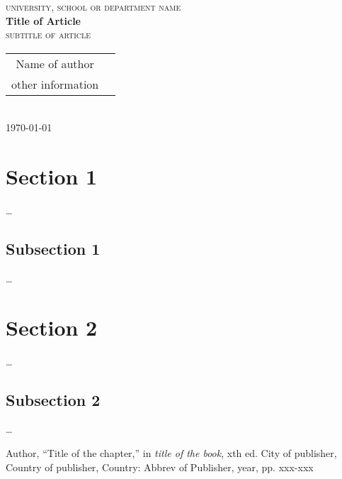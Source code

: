 \documentclass[10pt, a4paper, oneside]{article}
\begin{document}
\thispagestyle{empty}
\begin{center}
  \textsc{university, school or department name} \\ [60pt] 

  \textbf{{\LARGE Title of Article}} \\ [1pt]
  \textsc{{\large subtitle of article }} \\ [20pt]

  \begin{tabular}{cc}
    Name of author  \\
    other information
  \end{tabular} \\ [20pt]
  \today \\
\end{center}

\tableofcontents

\begin{abstract}
\ldots
\end{abstract}

\newpage

\section{Section 1}
\ldots
\subsection{Subsection 1}
\ldots

\section{Section 2}
\ldots
\subsection{Subsection 2}
\ldots
      
\begin{thebibliography}{9}

  Author,
  ``Title of the chapter,'' in 
  \emph{title of the book},
  xth ed.
  City of publisher,
  Country of publisher,
  Country:
  Abbrev of Publisher,
  year,
  pp. xxx-xxx

\end{thebibliography}      
      
\end{document}
